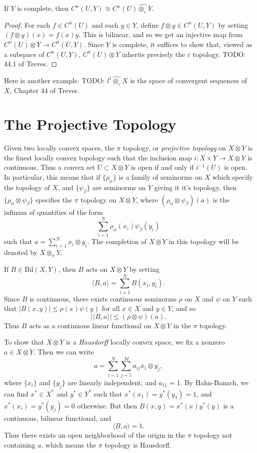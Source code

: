 \begin{theorem}
    If $Y$ is complete, then $C^n(U,Y) \cong C^n(U) \widehat{\otimes_\varepsilon} Y$.
\end{theorem}
\begin{proof}
    For each $f \in C^n(U)$ and each $y \in Y$, define $f \otimes y \in C^n(U,Y)$ by setting $(f \otimes y)(x) = f(x) y$. This is bilinear, and so we get an injective map from $C^n(U) \otimes Y \to C^n(U,Y)$. Since $Y$ is complete, it suffices to show that, viewed as a subspace of $C^n(U,Y)$, $C^n(U) \otimes Y$ inherits precisely the $\varepsilon$ topology. TODO: 44.1 of Treves.
\end{proof}

Here is another example. TODO: $l^1 \widehat{\otimes_\varepsilon} X$ is the space of convergent sequences of $X$, Chapter 44 of Treves.

\section{The Projective Topology}

Given two locally convex spaces, the $\pi$ topology, or \emph{projective topology} on $X \otimes Y$ is the finest locally convex topology such that the inclusion map $i: X \times Y \to X \otimes Y$ is continuous. Thus a convex set $U \subset X \otimes Y$ is open if and only if $i^{-1}(U)$ is open. In particular, this means that if $\{ \rho_\alpha \}$ is a family of seminorms on $X$ which specify the topology of $X$, and $\{ \psi_\beta \}$ are seminorms on $Y$ giving it it's topology, then $\{ \rho_\alpha \otimes \psi_\beta \}$ specifies the $\pi$ topology on $X \otimes Y$, where $(\rho_\alpha \otimes \psi_\beta)(a)$ is the infinum of quantities of the form
%
\[ \sum_{i = 1}^N \rho_\alpha(x_i) \psi_\beta(y_i) \]
%
such that $a = \sum_{i = 1}^N x_i \otimes y_i$. The completion of $X \otimes Y$ in this topology will be denoted by $X \otimes_\pi Y$.

If $B \in \text{Bil}(X,Y)$, then $B$ acts on $X \otimes Y$ by setting
%
\[ \langle B, a \rangle = \sum_{i = 1}^N B(x_i,y_i). \]
%
Since $B$ is continuous, there exists continuous seminorms $\rho$ on $X$ and $\psi$ on $Y$ such that $|B(x,y)| \leq \rho(x) \psi(y)$ for all $x \in X$ and $y \in Y$, and so
%
\[ |\langle B, a \rangle| \leq (\rho \otimes \psi)(a). \]
%
Thus $B$ acts as a continuous linear functional on $X \otimes Y$ in the $\pi$ topology.

To show that $X \otimes Y$ is a \emph{Hausdorff} locally convex space, we fix a nonzero $a \in X \otimes Y$. Then we can write
%
\[ a = \sum_{i = 1}^N \sum_{j = 1}^M a_{ij} x_i \otimes y_j, \]
%
where $\{ x_i \}$ and $\{ y_j \}$ are linearly independent, and $a_{11} = 1$. By Hahn-Banach, we can find $x^* \in X^*$ and $y^* \in Y^*$ such that $x^*(x_1) = y^*(y_1) = 1$, and $x^*(x_i) = y^*(y_j) = 0$ otherwise. But then $B(x,y) = x^*(x) y^*(y)$ is a continuous, bilinear functional, and
%
\[ \langle B, a \rangle = 1. \]
%
Thus there exists an open neighborhood of the origin in the $\pi$ topology not containing $a$, which means the $\pi$ topology is Hausdorff.

